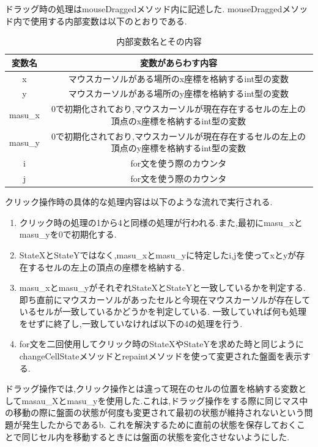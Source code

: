 \documentclass[dvipdfmx]{jarticle}
\begin{document}
\begin{description}
    ドラッグ時の処理はmouseDraggedメソッド内に記述した.
    mouseDraggedメソッド内で使用する内部変数は以下のとおりである.
    \begin{table}[h]
        \centering
        \begin{tabular}{|c||c|}
            \hline
            変数名 & 変数があらわす内容\\\hline\hline
            x & マウスカーソルがある場所のx座標を格納するint型の変数\\\hline
            y & マウスカーソルがある場所のy座標を格納するint型の変数\\\hline
            masu\_x & 0で初期化されており,マウスカーソルが現在存在するセルの左上の頂点のx座標を格納するint型の変数\\\hline
            masu\_y & 0で初期化されており,マウスカーソルが現在存在するセルの左上の頂点のy座標を格納するint型の変数\\\hline
            i &for文を使う際のカウンタ\\\hline
            j &for文を使う際のカウンタ \\\hline
        \end{tabular}
        \caption{内部変数名とその内容}
    \end{table}
    クリック操作時の具体的な処理内容は以下のような流れで実行される.
    \begin{enumerate}
      \item クリック時の処理の1から4と同様の処理が行われる.また,最初にmasu\_xとmasu\_yを0で初期化する.
      \item StateXとStateYではなく,masu\_xとmasu\_yに特定したi,jを使ってxとyが存在するセルの左上の頂点の座標を格納する.
      \item masu\_xとmasu\_yがそれぞれStateXとStateYと一致しているかを判定する.即ち直前にマウスカーソルがあったセルと今現在マウスカーソルが存在しているセルが一致しているかどうかを判定している.
      一致していれば何も処理をせずに終了し,一致していなければ以下の4の処理を行う.
      \item for文を二回使用してクリック時のStateXやStateYを求めた時と同じようにchangeCellStateメソッドとrepaintメソッドを使って変更された盤面を表示する.
    \end{enumerate}
    ドラッグ操作では,クリック操作とは違って現在のセルの位置を格納する変数としてmasau\_Xとmasu\_yを使用した.これは,ドラッグ操作をする際に同じマス中の移動の際に盤面の状態が何度も変更されて最初の状態が維持されないという問題が発生したからであるb.
    これを解決するために直前の状態を保存しておくことで同じセル内を移動するときには盤面の状態を変化させないようにした.
\end{description}
\end{document}

